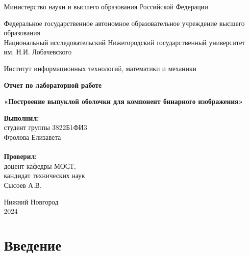 \documentclass{report}
\begin{document}
\begin{titlepage}

\begin{center}
Министерство науки и высшего образования Российской Федерации
\end{center}

\begin{center}
Федеральное государственное автономное образовательное учреждение высшего образования \\
Национальный исследовательский Нижегородский государственный университет им. Н.И. Лобачевского
\end{center}

\begin{center}
Институт информационных технологий, математики и механики
\end{center}

\vspace{4em}

\begin{center}
\textbf{\Large Отчет по лабораторной работе} \\
\end{center}
\begin{center}
\textbf{\Large «Построение выпуклой оболочки для компонент бинарного изображения»} \\
\end{center}

\vspace{4em}

\hfill\parbox{7cm}{
\textbf{Выполнил:} \\ 
студент группы 3822Б1ФИ3 \\ 
Фролова Елизавета\\
\\
\textbf{Проверил:}\\ 
доцент кафедры МОСТ, \\ 
кандидат технических наук \\ 
Сысоев А.В.\\}

\vspace{\fill}

\begin{center} Нижний Новгород \\ 2024 \end{center}

\end{titlepage}

\setcounter{page}{2}
\tableofcontents

\newpage
\section*{Введение}
\end{document}
